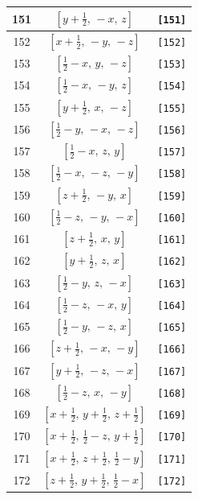\documentclass[fleqn,8pt]{jsarticle}
\begin{document}
\begin{longtable}{ccc}
151 & $\left[ y + \frac{1}{2},\, - x,\, z \right]$ & {\tt [151]} \\ \hline
152 & $\left[ x + \frac{1}{2},\, - y,\, - z \right]$ & {\tt [152]} \\ \hline
153 & $\left[ \frac{1}{2} - x,\, y,\, - z \right]$ & {\tt [153]} \\ \hline
154 & $\left[ \frac{1}{2} - x,\, - y,\, z \right]$ & {\tt [154]} \\ \hline
155 & $\left[ y + \frac{1}{2},\, x,\, - z \right]$ & {\tt [155]} \\ \hline
156 & $\left[ \frac{1}{2} - y,\, - x,\, - z \right]$ & {\tt [156]} \\ \hline
157 & $\left[ \frac{1}{2} - x,\, z,\, y \right]$ & {\tt [157]} \\ \hline
158 & $\left[ \frac{1}{2} - x,\, - z,\, - y \right]$ & {\tt [158]} \\ \hline
159 & $\left[ z + \frac{1}{2},\, - y,\, x \right]$ & {\tt [159]} \\ \hline
160 & $\left[ \frac{1}{2} - z,\, - y,\, - x \right]$ & {\tt [160]} \\ \hline
161 & $\left[ z + \frac{1}{2},\, x,\, y \right]$ & {\tt [161]} \\ \hline
162 & $\left[ y + \frac{1}{2},\, z,\, x \right]$ & {\tt [162]} \\ \hline
163 & $\left[ \frac{1}{2} - y,\, z,\, - x \right]$ & {\tt [163]} \\ \hline
164 & $\left[ \frac{1}{2} - z,\, - x,\, y \right]$ & {\tt [164]} \\ \hline
165 & $\left[ \frac{1}{2} - y,\, - z,\, x \right]$ & {\tt [165]} \\ \hline
166 & $\left[ z + \frac{1}{2},\, - x,\, - y \right]$ & {\tt [166]} \\ \hline
167 & $\left[ y + \frac{1}{2},\, - z,\, - x \right]$ & {\tt [167]} \\ \hline
168 & $\left[ \frac{1}{2} - z,\, x,\, - y \right]$ & {\tt [168]} \\ \hline
169 & $\left[ x + \frac{1}{2},\, y + \frac{1}{2},\, z + \frac{1}{2} \right]$ & {\tt [169]} \\ \hline
170 & $\left[ x + \frac{1}{2},\, \frac{1}{2} - z,\, y + \frac{1}{2} \right]$ & {\tt [170]} \\ \hline
171 & $\left[ x + \frac{1}{2},\, z + \frac{1}{2},\, \frac{1}{2} - y \right]$ & {\tt [171]} \\ \hline
172 & $\left[ z + \frac{1}{2},\, y + \frac{1}{2},\, \frac{1}{2} - x \right]$ & {\tt [172]} \\ \hline

\end{longtable}
\end{document}
